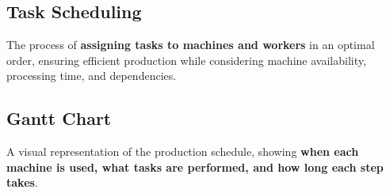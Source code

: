 \subsection{Task Scheduling}
The process of \textbf{assigning tasks to machines and workers} in an optimal order, ensuring efficient production while considering machine availability, processing time, and dependencies.

\subsection{Gantt Chart}
A visual representation of the production schedule, showing \textbf{when each machine is used, what tasks are performed, and how long each step takes}.
